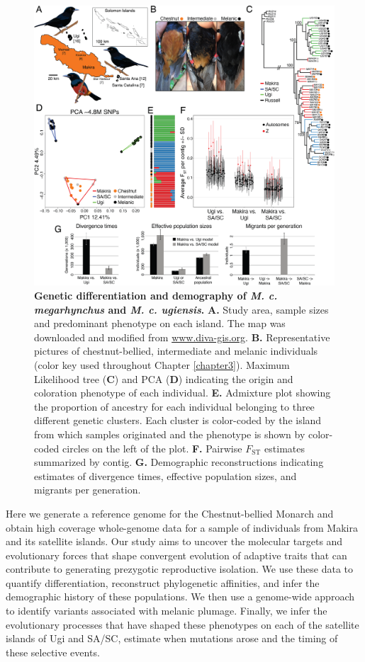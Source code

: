 \begin{figure}
    \centering
    \includegraphics[width=\textwidth]{monarcha_figs/mon_F1.PNG}
    \caption[Genetic differentiation and demography of \textit{M. c. megarhynchus} and \textit{M. c. ugiensis}.]{\textbf{Genetic differentiation and demography of \textit{M. c. megarhynchus} and \textit{M. c. ugiensis}.} \textbf{A.} Study area, sample sizes and predominant phenotype on each island. The map was downloaded and modified from \href{www.diva-gis.org}{www.diva-gis.org}. \textbf{B.} Representative pictures of chestnut-bellied, intermediate and melanic individuals (color key used throughout Chapter \ref{chapter3}). Maximum Likelihood tree (\textbf{C}) and \acs{PCA} (\textbf{D}) indicating the origin and coloration phenotype of each individual. \textbf{E.} Admixture plot showing the proportion of ancestry for each individual belonging to three different genetic clusters. Each cluster is color-coded by the island from which samples originated and the phenotype is shown by color-coded circles on the left of the plot. \textbf{F.} Pairwise $F_{\mathrm{ST}}$ estimates summarized by contig. \textbf{G.} Demographic reconstructions indicating estimates of divergence times, effective population sizes, and migrants per generation.}
    \label{fig:mon-F1}
\end{figure}

Here we generate a reference genome for the Chestnut-bellied Monarch and obtain high coverage whole-genome data for a sample of individuals from Makira and its satellite islands. Our study aims to uncover the molecular targets and evolutionary forces that shape convergent evolution of adaptive traits that can contribute to generating prezygotic reproductive isolation. We use these data to quantify differentiation, reconstruct phylogenetic affinities, and infer the demographic history of these populations. We then use a genome-wide approach to identify variants associated with melanic plumage. Finally, we infer the evolutionary processes that have shaped these phenotypes on each of the satellite islands of Ugi and \ac{SA/SC}, estimate when mutations arose and the timing of these selective events.

